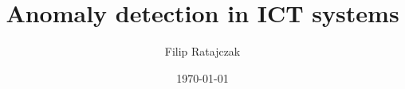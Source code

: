 \documentclass{article}
\title{Anomaly detection in ICT systems}
\author{Filip Ratajczak}
\date{\today}
\begin{document}
\maketitle
{}
\end{document}
